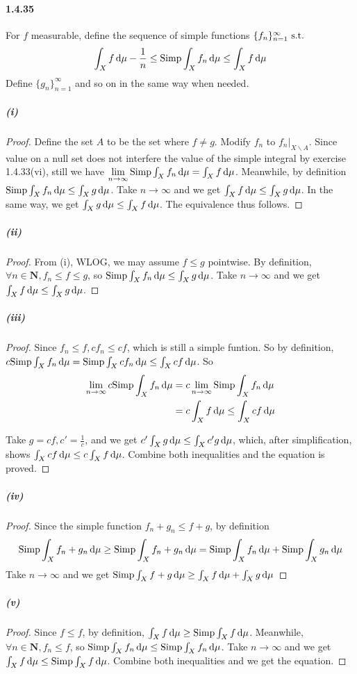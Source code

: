 \documentclass{article}
\begin{document}
\paragraph{1.4.35}
For $f$ measurable, define the sequence of simple functions $\{f_n\}_{n=1}^{\infty}\text{ s.t.} $\[\int_{X} f\,\mathrm{d} \mu-\frac 1 n\leq \mathrm{Simp}\int_{X} f_n\,\mathrm{d} \mu\leq \int_{X} f\,\mathrm{d} \mu\] Define $\{g_n\}_{n=1}^{\infty}$ and so on in the same way when needed.
\subparagraph{(i)}
\begin{proof}
Define the set $A$ to be the set where $f\neq g$. Modify $f_n$ to $f_n|_{X\backslash A}$. Since value on a null set does not interfere the value of the simple integral by exercise 1.4.33(vi), still we have $\lim\limits_{n\to\infty}\mathrm{Simp}\int_{X} f_n\,\mathrm{d} \mu=\int_{X} f\,\mathrm{d} \mu$. Meanwhile, by definition $\mathrm{Simp}\int_{X} f_n\,\mathrm{d} \mu\leq \int_{X} g\,\mathrm{d} \mu$. Take $n\to \infty$ and we get $\int_{X} f\,\mathrm{d} \mu\leq \int_{X} g\,\mathrm{d} \mu$. In the same way, we get $\int_{X} g\,\mathrm{d} \mu\leq \int_{X} f\,\mathrm{d} \mu$. The equivalence thus follows.
\end{proof}
\subparagraph{(ii)}
\begin{proof}
From (i), WLOG, we may assume $f\leq g$ pointwise. By definition, $\forall n\in \mathbf{N}, f_n\leq f\leq g$, so $\mathrm{Simp}\int_{X} f_n\,\mathrm{d} \mu\leq \int_{X} g\,\mathrm{d} \mu$. Take $n\to\infty$ and we get $\int_{X} f\,\mathrm{d} \mu\leq \int_{X} g\,\mathrm{d} \mu$.
\end{proof}
\subparagraph{(iii)}
\begin{proof}
Since $f_n\leq f, cf_n\leq cf$, which is still a simple funtion. So by definition, $c\mathrm{Simp}\int_{X} f_n\,\mathrm{d} \mu =\mathrm{Simp}\int_{X} cf_n\,\mathrm{d} \mu\leq\int_{X} cf\,\mathrm{d} \mu$. So
\[\begin{aligned}
\lim\limits_{n\to\infty}c\mathrm{Simp}\int_{X} f_n\,\mathrm{d} \mu&=c\lim\limits_{n\to\infty}\mathrm{Simp}\int_{X} f_n\,\mathrm{d} \mu\\&=c\int_{X} f\,\mathrm{d} \mu\leq \int_{X} cf\,\mathrm{d} \mu
\end{aligned}\] 

Take $g=cf, c'=\frac 1 c$, and we get $c'\int_{X} g\,\mathrm{d} \mu\leq \int_{X} c'g\,\mathrm{d} \mu$, which, after simplification, shows $\int_{X} cf\,\mathrm{d} \mu\leq c\int_{X} f\,\mathrm{d} \mu$. Combine both inequalities and the equation is proved.
\end{proof}
\subparagraph{(iv)}
\begin{proof}
Since the simple function $f_n+g_n\leq f+g$, by definition \[\mathrm{Simp}\int_{X} f_n+g_n\,\mathrm{d} \mu\geq\mathrm{Simp}\int_{X} f_n+g_n\,\mathrm{d} \mu=\mathrm{Simp}\int_{X} f_n\,\mathrm{d} \mu+\mathrm{Simp}\int_{X} g_n\,\mathrm{d} \mu\] Take $n\to\infty$ and we get $\mathrm{Simp}\int_{X} f+g\,\mathrm{d} \mu\geq\int_{X} f\,\mathrm{d} \mu+\int_{X} g\,\mathrm{d} \mu$
\end{proof}
\subparagraph{(v)}
\begin{proof}
Since $f\leq f$, by definition, $\int_{X} f\,\mathrm{d} \mu\geq \mathrm{Simp}\int_{X} f\,\mathrm{d} \mu$. Meanwhile, $\forall n\in\mathbf{N}, f_n\leq f$, so $\mathrm{Simp}\int_{X} f_n\,\mathrm{d} \mu\leq \mathrm{Simp}\int_{X} f_n\,\mathrm{d} \mu$. Take $n\to\infty$ and we get $\int_{X} f\,\mathrm{d} \mu\leq \mathrm{Simp}\int_{X} f\,\mathrm{d} \mu$. Combine both inequalities and we get the equation.
\end{proof}
\end{document}
